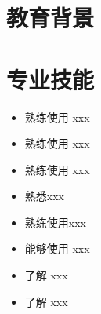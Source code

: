 \documentclass{resume}
\begin{document}







\section{教育背景}


\section{专业技能}

\begin{itemize}[parsep=0.5ex]
  \item 熟练使用 xxx
  \item 熟练使用 xxx
  \item 熟练使用 xxx
  \item 熟悉xxx
  \item 熟练使用xxx
  \item 能够使用 xxx
  \item 了解 xxx
  \item 了解 xxx
\end{itemize}
\end{document}
